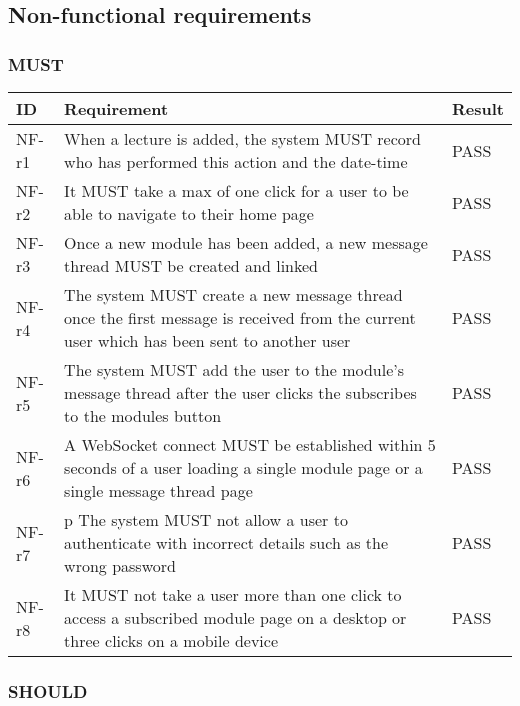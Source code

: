 \subsection{Non-functional requirements}
\subsubsection{MUST}

\begin{tabular}{|p{1cm}|p{10cm}|p{3cm}|}
    \hline
        \textbf{ID} & \textbf{Requirement} & \textbf{Result} \\
    \hline
    NF-r1 &
    When a lecture is added, the system MUST record who has performed this action and the date-time & 
    PASS \\
    \hline
    NF-r2 &
    It MUST take a max of one click for a user to be able to navigate to their home page & 
    PASS \\
    \hline
    NF-r3 &
    Once a new module has been added, a new message thread MUST be created and linked & 
    PASS \\
    \hline
    NF-r4 &
    The system MUST create a new message thread once the first message is received from the current user which has been sent to another user & 
    PASS \\
    \hline
    NF-r5 &
    The system MUST add the user to the module's message thread after the user clicks the subscribes to the modules button  & 
    PASS \\
    \hline
    NF-r6 &
    A WebSocket connect MUST be established within 5 seconds of a user loading a single module page or a single message thread page & 
    PASS \\
    \hline
    NF-r7 &
    p
    The system MUST not allow a user to authenticate with incorrect details such as the wrong password & 
    PASS \\
    \hline
    NF-r8 &
    It MUST not take a user more than one click to access a subscribed module page on a desktop or three clicks on a mobile device &  
    PASS \\
    \hline
\end{tabular}    

\subsubsection{SHOULD}

